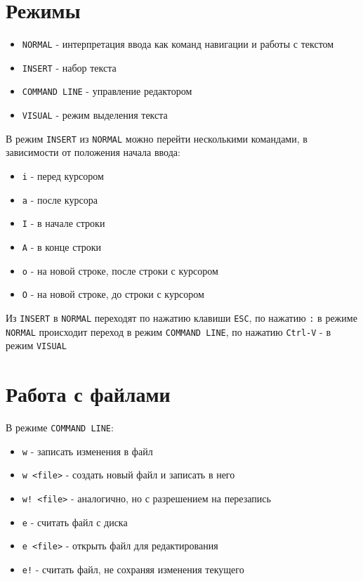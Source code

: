 \documentclass[12pt, a4paper]{article}
\begin{document}

\section{Режимы}
\begin{itemize}
  \item \texttt{NORMAL} - интерпретация ввода как команд навигации и работы с
    текстом
  \item \texttt{INSERT} - набор текста
  \item \texttt{COMMAND LINE} - управление редактором
  \item \texttt{VISUAL} - режим выделения текста
\end{itemize}
В режим \texttt{INSERT} из \texttt{NORMAL} можно перейти несколькими командами,
в зависимости от положения начала ввода:
\begin{itemize}
  \item \texttt{i} - перед курсором
  \item \texttt{a} - после курсора
  \item \texttt{I} - в начале строки
  \item \texttt{A} - в конце строки
  \item \texttt{o} - на новой строке, после строки с курсором
  \item \texttt{O} - на новой строке, до строки с курсором
\end{itemize}
Из \texttt{INSERT} в \texttt{NORMAL} переходят по нажатию клавиши \texttt{ESC},
по нажатию \texttt{:} в режиме \texttt{NORMAL} происходит переход в режим
\texttt{COMMAND LINE}, по нажатию \texttt{Ctrl-V} - в режим \texttt{VISUAL}

\section{Работа с файлами}
В режиме \texttt{COMMAND LINE}:
\begin{itemize}
  \item \texttt{w} - записать изменения в файл
  \item \texttt{w <file>} - создать новый файл и записать в него
  \item \texttt{w! <file>} - аналогично, но с разрешением на перезапись
  \item \texttt{e} - считать файл с диска
  \item \texttt{e <file>} - открыть файл для редактирования
  \item \texttt{e!} - считать файл, не сохраняя изменения текущего
\end{itemize}
\end{document}
